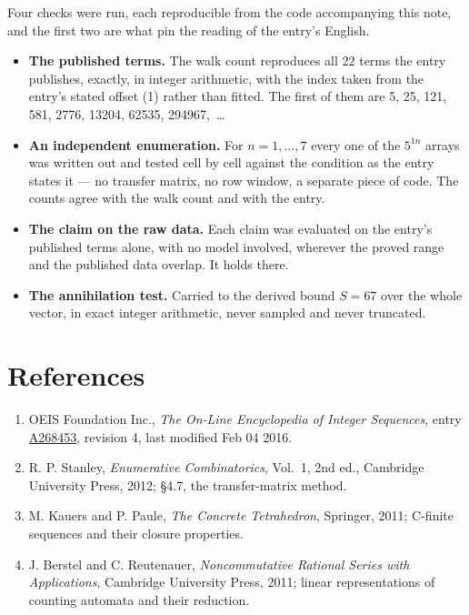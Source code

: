 \documentclass[11pt]{article}
\theoremstyle{definition}
\begin{document}
Four checks were run, each reproducible from the code accompanying this note, and the first two are what pin the reading of the entry's English.

\begin{itemize}

\item {\bfseries The published terms.} The walk count reproduces all 22 terms the entry publishes, exactly, in integer arithmetic, with the index taken from the entry's stated offset (1) rather than fitted. The first of them are 5, 25, 121, 581, 2776, 13204, 62535, 294967,~\dots

\item {\bfseries An independent enumeration.} For $n = 1,\dots,7$ every one of the $5^{1n}$ arrays was written out and tested cell by cell against the condition as the entry states it --- no transfer matrix, no row window, a separate piece of code. The counts agree with the walk count and with the entry.

\item {\bfseries The claim on the raw data.} Each claim was evaluated on the entry's published terms alone, with no model involved, wherever the proved range and the published data overlap. It holds there.

\item {\bfseries The annihilation test.} Carried to the derived bound $S = 67$ over the whole vector, in exact integer arithmetic, never sampled and never truncated.

\end{itemize}

\section{References}

\begin{enumerate}

\item OEIS Foundation Inc., \emph{The On-Line Encyclopedia of Integer Sequences}, entry \href{https://oeis.org/A268453}{A268453}, revision 4, last modified Feb 04 2016.

\item R. P. Stanley, \emph{Enumerative Combinatorics}, Vol.~1, 2nd ed., Cambridge University Press, 2012; \S4.7, the transfer-matrix method.

\item M. Kauers and P. Paule, \emph{The Concrete Tetrahedron}, Springer, 2011; C-finite sequences and their closure properties.

\item J. Berstel and C. Reutenauer, \emph{Noncommutative Rational Series with Applications}, Cambridge University Press, 2011; linear representations of counting automata and their reduction.

\end{enumerate}
\end{document}
